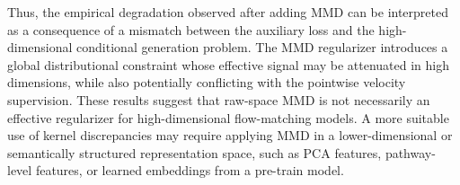\documentclass[11pt]{article}
\begin{document}

Thus, the empirical degradation observed after adding MMD can be interpreted as a consequence of a mismatch between the auxiliary loss and the high-dimensional conditional generation problem. The MMD regularizer introduces a global distributional constraint whose effective signal may be attenuated in high dimensions, while also potentially conflicting with the pointwise velocity supervision. These results suggest that raw-space MMD is not necessarily an effective regularizer for high-dimensional flow-matching models. A more suitable use of kernel discrepancies may require applying MMD in a lower-dimensional or semantically structured representation space, such as PCA features, pathway-level features, or learned embeddings from a pre-train model.

\end{document}
